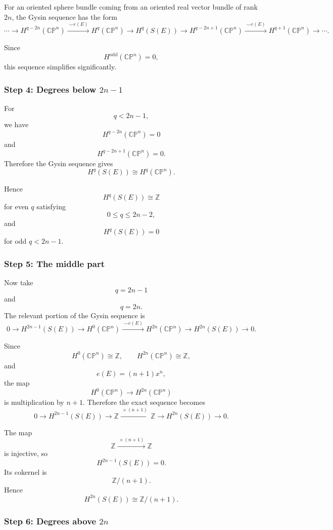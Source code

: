 \documentclass[12pt,a4paper]{article}
\theoremstyle{notespace}
\begin{document}
For an oriented sphere bundle coming from an oriented real vector bundle of rank
\(2n\), the Gysin sequence has the form
\[
\cdots
\longrightarrow
H^{q-2n}(\mathbb{CP}^n)
\xrightarrow{\ \smile e(E)\ }
H^q(\mathbb{CP}^n)
\longrightarrow
H^q(S(E))
\longrightarrow
H^{q-2n+1}(\mathbb{CP}^n)
\xrightarrow{\ \smile e(E)\ }
H^{q+1}(\mathbb{CP}^n)
\longrightarrow
\cdots .
\]

Since
\[
H^{\text{odd}}(\mathbb{CP}^n)=0,
\]
this sequence simplifies significantly.

\subsubsection*{Step 4: Degrees below \(2n-1\)}

For
\[
q<2n-1,
\]
we have
\[
H^{q-2n}(\mathbb{CP}^n)=0
\]
and
\[
H^{q-2n+1}(\mathbb{CP}^n)=0.
\]
Therefore the Gysin sequence gives
\[
H^q(S(E))\cong H^q(\mathbb{CP}^n).
\]

Hence
\[
H^q(S(E))\cong \mathbb Z
\]
for even \(q\) satisfying
\[
0\le q\le 2n-2,
\]
and
\[
H^q(S(E))=0
\]
for odd \(q<2n-1\).

\subsubsection*{Step 5: The middle part}

Now take
\[
q=2n-1
\]
and
\[
q=2n.
\]
The relevant portion of the Gysin sequence is
\[
0
\longrightarrow
H^{2n-1}(S(E))
\longrightarrow
H^0(\mathbb{CP}^n)
\xrightarrow{\ \smile e(E)\ }
H^{2n}(\mathbb{CP}^n)
\longrightarrow
H^{2n}(S(E))
\longrightarrow
0.
\]

Since
\[
H^0(\mathbb{CP}^n)\cong \mathbb Z,
\qquad
H^{2n}(\mathbb{CP}^n)\cong \mathbb Z,
\]
and
\[
e(E)=(n+1)x^n,
\]
the map
\[
H^0(\mathbb{CP}^n)\longrightarrow H^{2n}(\mathbb{CP}^n)
\]
is multiplication by \(n+1\). Therefore the exact sequence becomes
\[
0
\longrightarrow
H^{2n-1}(S(E))
\longrightarrow
\mathbb Z
\xrightarrow{\ \times(n+1)\ }
\mathbb Z
\longrightarrow
H^{2n}(S(E))
\longrightarrow
0.
\]

The map
\[
\mathbb Z\xrightarrow{\ \times(n+1)\ }\mathbb Z
\]
is injective, so
\[
H^{2n-1}(S(E))=0.
\]
Its cokernel is
\[
\mathbb Z/(n+1).
\]
Hence
\[
H^{2n}(S(E))\cong \mathbb Z/(n+1).
\]

\subsubsection*{Step 6: Degrees above \(2n\)}
\end{document}
